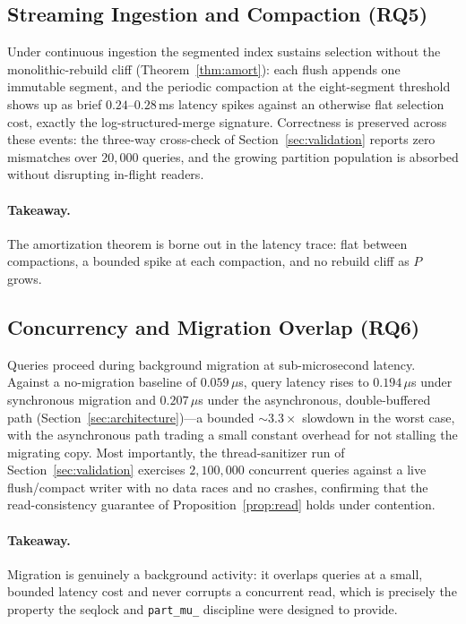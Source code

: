 \documentclass[10pt]{article}
\theoremstyle{definition}
\begin{document}
\subsection{Streaming Ingestion and Compaction (RQ5)}
\label{sec:rq5}

Under continuous ingestion the segmented index sustains selection without the
monolithic-rebuild cliff (Theorem~\ref{thm:amort}): each flush appends one immutable
segment, and the periodic compaction at the eight-segment threshold shows up as brief
$0.24$--$0.28$\,ms latency spikes against an otherwise flat selection cost, exactly
the log-structured-merge signature. Correctness is preserved across these events: the
three-way cross-check of Section~\ref{sec:validation} reports zero mismatches over
$20{,}000$ queries, and the growing partition population is absorbed without
disrupting in-flight readers.

\paragraph{Takeaway.}
The amortization theorem is borne out in the latency trace: flat between compactions,
a bounded spike at each compaction, and no rebuild cliff as $P$ grows.

\subsection{Concurrency and Migration Overlap (RQ6)}
\label{sec:rq6}

Queries proceed during background migration at sub-microsecond latency. Against a
no-migration baseline of $0.059\,\mu$s, query latency rises to $0.194\,\mu$s under
synchronous migration and $0.207\,\mu$s under the asynchronous, double-buffered path
(Section~\ref{sec:architecture})---a bounded ${\sim}3.3\times$ slowdown in the worst
case, with the asynchronous path trading a small constant overhead for not stalling
the migrating copy. Most importantly, the thread-sanitizer run of
Section~\ref{sec:validation} exercises $2{,}100{,}000$ concurrent queries against a
live flush/compact writer with no data races and no crashes, confirming that the
read-consistency guarantee of Proposition~\ref{prop:read} holds under contention.

\paragraph{Takeaway.}
Migration is genuinely a background activity: it overlaps queries at a small, bounded
latency cost and never corrupts a concurrent read, which is precisely the property
the seqlock and \texttt{part\_mu\_} discipline were designed to provide.
\end{document}
